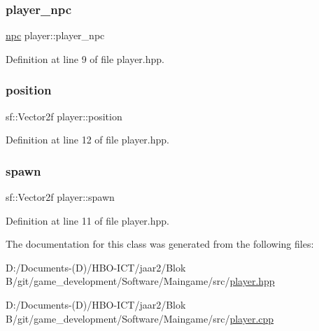 \subsubsection{\texorpdfstring{player\+\_\+npc}{player\_npc}}
{\footnotesize\ttfamily \hyperlink{classnpc}{npc} player\+::player\+\_\+npc\hspace{0.3cm}{\ttfamily [private]}}



Definition at line 9 of file player.\+hpp.

\mbox{\label{classplayer_a7e37704e10e2be3e02a155127495727e}} 
\subsubsection{\texorpdfstring{position}{position}}
{\footnotesize\ttfamily sf\+::\+Vector2f player\+::position\hspace{0.3cm}{\ttfamily [private]}}



Definition at line 12 of file player.\+hpp.

\mbox{\label{classplayer_a3809687b5d650b424726ef2f61c285de}} 
\subsubsection{\texorpdfstring{spawn}{spawn}}
{\footnotesize\ttfamily sf\+::\+Vector2f player\+::spawn\hspace{0.3cm}{\ttfamily [private]}}



Definition at line 11 of file player.\+hpp.



The documentation for this class was generated from the following files\+:\begin{DoxyCompactItemize}
\item 
D\+:/\+Documents-\/(\+D)/\+H\+B\+O-\/\+I\+C\+T/jaar2/\+Blok B/git/game\+\_\+development/\+Software/\+Maingame/src/\hyperlink{player_8hpp}{player.\+hpp}\item 
D\+:/\+Documents-\/(\+D)/\+H\+B\+O-\/\+I\+C\+T/jaar2/\+Blok B/git/game\+\_\+development/\+Software/\+Maingame/src/\hyperlink{player_8cpp}{player.\+cpp}\end{DoxyCompactItemize}
